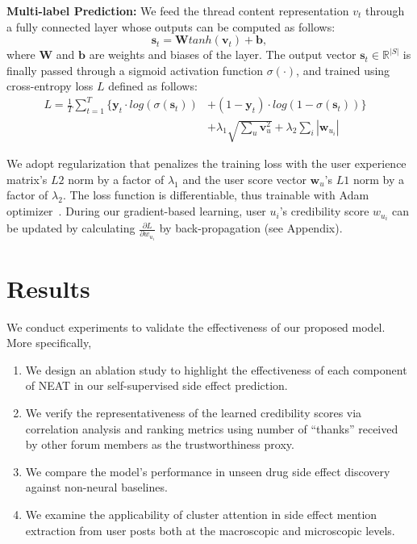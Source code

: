 \documentclass{bmcart}
\begin{document}
\textbf{Multi-label Prediction:} We feed the thread content
representation $v_t$ through a fully connected layer whose outputs can be computed as follows:
\begin{equation}\label{eq:dense}
\boldsymbol{s}_{t}=\boldsymbol{W}tanh(\boldsymbol{v}_{t})+\boldsymbol{b}, 
\end{equation}
where $\boldsymbol{W}$ and $\boldsymbol{b}$ are weights and biases of
the layer. The output vector $\boldsymbol{s}_{t} \in \mathbb{R}^{|S|}$
is finally passed through a sigmoid activation function $\sigma(\cdot)$,
and trained using cross-entropy loss $L$ defined as follows:   
\begin{equation}\label{eq:overall_loss}
  \begin{aligned}
    L=\frac{1}{T}\sum^T_{t=1}\{\boldsymbol{y}_{t} \cdot log(\sigma(\boldsymbol{s}_{t}))&+(1-\boldsymbol{y}_{t})\cdot log(1-\sigma(\boldsymbol{s}_{t}))\}& \\ 
    &+\lambda_1\sqrt{\sum_{u}\boldsymbol{v}_{u}^{2}}+\lambda_2\sum_{i}{{|\boldsymbol{w}_{u_{i}}|}}&
  \end{aligned}
\end{equation}

We adopt regularization that penalizes the training loss with the user
experience matrix's $L2$ norm by a factor of $\lambda_1$ and the user score vector $\boldsymbol{w}_{u}$'s $L1$ norm by a factor of $\lambda_2$. The loss function is differentiable, thus
trainable with Adam optimizer~\cite{kingma2015adam}. 
During our gradient-based learning, 
user ${u_i}$'s credibility score $w_{u_i}$ can be updated by calculating 
$\frac{\partial L}{\partial w_{u_i}}$ by back-propagation (see Appendix).

\section{Results}\label{sec:results}

We conduct experiments to validate the effectiveness of our proposed model. More specifically,
\begin{enumerate}
    \item We design an ablation study to highlight the effectiveness of each component of NEAT in our self-supervised side effect prediction.
    \item We verify the representativeness of the learned credibility scores via correlation analysis and ranking metrics using number of ``thanks'' received by other forum members as the trustworthiness proxy.
    \item We compare the model's performance in unseen drug side effect discovery against non-neural baselines.
    \item We examine the applicability of cluster attention in side effect mention extraction from user posts both at the macroscopic and microscopic levels. \\
\end{enumerate}
\end{document}
